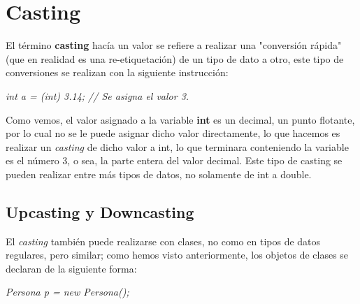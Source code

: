 \section{Casting}
\hspace{0.55cm}El término \textbf{casting} hacía un valor se refiere a realizar una "conversión rápida" (que en realidad es una re-etiquetación) de un tipo de dato a otro, este tipo de conversiones se realizan con la siguiente instrucción:
\begin{center}
	\textit{int a = (int) 3.14; // Se asigna el valor 3.}
\end{center}

Como vemos, el valor asignado a la variable \textbf{int} es un decimal, un punto flotante, por lo cual no se le puede asignar dicho valor directamente, lo que hacemos es realizar un \textit{casting} de dicho valor a int, lo que terminara conteniendo la variable es el número 3, o sea, la parte entera del valor decimal. Este tipo de casting se pueden realizar entre más tipos de datos, no solamente de int a double.


\subsection{Upcasting y Downcasting}
\hspace{0.55cm}El \textit{casting} también puede realizarse con clases, no como en tipos de datos regulares, pero similar; como hemos visto anteriormente, los objetos de clases se declaran de la siguiente forma:
\begin{center}
	\textit{Persona p = new Persona();}
\end{center}

